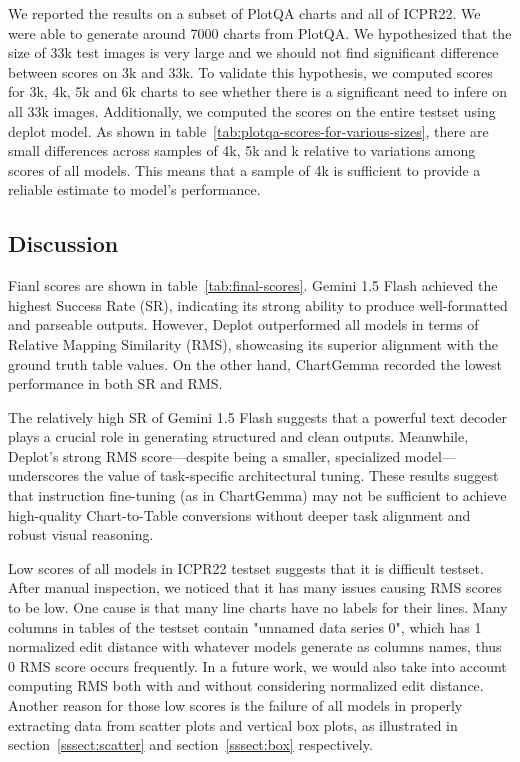 \documentclass[
	letterpaper, %
]{jdf}
\begin{document}
We reported the results on a subset of PlotQA charts and all of ICPR22.
We were able to generate around 7000 charts from PlotQA.
We hypothesized that the size of 33k test images is very large and we should not find significant difference between scores on 3k and 33k.
To validate this hypothesis, we computed scores for 3k, 4k, 5k and 6k charts to see whether there is a significant need to infere on all 33k images.
Additionally, we computed the scores on the entire testset using deplot model.
As shown in table~\ref{tab:plotqa-scores-for-various-sizes}, there are small differences across samples of 4k, 5k and k relative to variations among scores of all models.
This means that a sample of 4k is sufficient to provide a reliable estimate to model's performance.


\subsection{Discussion}\label{ssect:discussion}

Fianl scores are shown in table~\ref{tab:final-scores}.
Gemini 1.5 Flash achieved the highest Success Rate (SR), indicating its strong ability to produce well-formatted and parseable outputs.
However, Deplot outperformed all models in terms of Relative Mapping Similarity (RMS), showcasing its superior alignment with the ground truth table values.
On the other hand, ChartGemma recorded the lowest performance in both SR and RMS.

The relatively high SR of Gemini 1.5 Flash suggests that a powerful text decoder plays a crucial role in generating structured and clean outputs.
Meanwhile, Deplot’s strong RMS score—despite being a smaller, specialized model—underscores the value of task-specific architectural tuning.
These results suggest that instruction fine-tuning (as in ChartGemma) may not be sufficient to achieve high-quality Chart-to-Table conversions without deeper task alignment and robust visual reasoning.

Low scores of all models in ICPR22 testset suggests that it is difficult testset.
After manual inspection, we noticed that it has many issues causing RMS scores to be low.
One cause is that many line charts have no labels for their lines.
Many columns in tables of the testset contain "unnamed data series 0", which has 1 normalized edit distance with whatever models generate as columns names, thus 0 RMS score occurs frequently.
In a future work, we would also take into account computing RMS both with and without considering normalized edit distance.
Another reason for those low scores is the failure of all models in properly extracting data from scatter plots and vertical box plots, as illustrated in section~\ref{sssect:scatter} and section~\ref{sssect:box} respectively.
\end{document}
